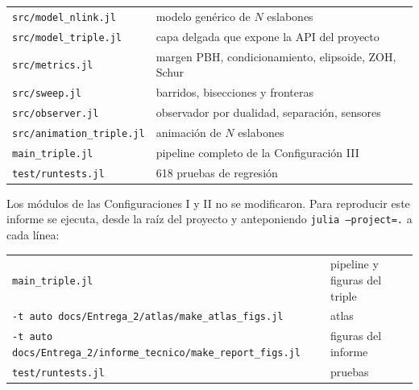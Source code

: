 \documentclass[11pt,letterpaper]{article}
\theoremstyle{definition}
\theoremstyle{plain}
\theoremstyle{remark}
\begin{document}
\begin{center}\small
\begin{tabular}{@{}ll@{}}
\toprule
\texttt{src/model\_nlink.jl} & modelo genérico de $N$ eslabones\\
\texttt{src/model\_triple.jl} & capa delgada que expone la API del proyecto\\
\texttt{src/metrics.jl} & margen PBH, condicionamiento, elipsoide, ZOH, Schur\\
\texttt{src/sweep.jl} & barridos, bisecciones y fronteras\\
\texttt{src/observer.jl} & observador por dualidad, separación, sensores\\
\texttt{src/animation\_triple.jl} & animación de $N$ eslabones\\
\texttt{main\_triple.jl} & pipeline completo de la Configuración III\\
\texttt{test/runtests.jl} & 618 pruebas de regresión\\
\bottomrule
\end{tabular}
\end{center}

Los módulos de las Configuraciones I y II no se modificaron. Para reproducir
este informe se ejecuta, desde la raíz del proyecto y anteponiendo
\texttt{julia --project=.} a cada línea:

\begin{center}\small
\begin{tabular}{@{}ll@{}}
\toprule
\texttt{main\_triple.jl} & pipeline y figuras del triple\\
\texttt{-t auto docs/Entrega\_2/atlas/make\_atlas\_figs.jl} & atlas\\
\texttt{-t auto docs/Entrega\_2/informe\_tecnico/make\_report\_figs.jl} & figuras del informe\\
\texttt{test/runtests.jl} & pruebas\\
\bottomrule
\end{tabular}
\end{center}
\end{document}
